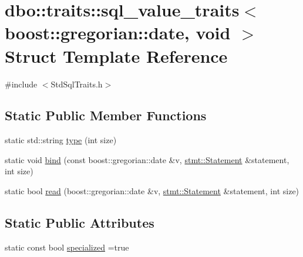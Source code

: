 \hypertarget{structdbo_1_1traits_1_1sql__value__traits_3_01boost_1_1gregorian_1_1date_00_01void_01_4}{\section{dbo\+:\+:traits\+:\+:sql\+\_\+value\+\_\+traits$<$ boost\+:\+:gregorian\+:\+:date, void $>$ Struct Template Reference}
\label{structdbo_1_1traits_1_1sql__value__traits_3_01boost_1_1gregorian_1_1date_00_01void_01_4}
}


{\ttfamily \#include $<$Std\+Sql\+Traits.\+h$>$}

\subsection*{Static Public Member Functions}
\begin{DoxyCompactItemize}
\item 
static std\+::string \hyperlink{structdbo_1_1traits_1_1sql__value__traits_3_01boost_1_1gregorian_1_1date_00_01void_01_4_a12466781c969af01d1a5979963808448}{type} (int size)
\item 
static void \hyperlink{structdbo_1_1traits_1_1sql__value__traits_3_01boost_1_1gregorian_1_1date_00_01void_01_4_a73212ed942ddf155b14de027b5357876}{bind} (const boost\+::gregorian\+::date \&v, \hyperlink{classdbo_1_1stmt_1_1_statement}{stmt\+::\+Statement} \&statement, int size)
\item 
static bool \hyperlink{structdbo_1_1traits_1_1sql__value__traits_3_01boost_1_1gregorian_1_1date_00_01void_01_4_a90e799ef857e15a07ce87a4c3386ce46}{read} (boost\+::gregorian\+::date \&v, \hyperlink{classdbo_1_1stmt_1_1_statement}{stmt\+::\+Statement} \&statement, int size)
\end{DoxyCompactItemize}
\subsection*{Static Public Attributes}
\begin{DoxyCompactItemize}
\item 
static const bool \hyperlink{structdbo_1_1traits_1_1sql__value__traits_3_01boost_1_1gregorian_1_1date_00_01void_01_4_a74c6fab38f896d9610eff0588baaa06e}{specialized} =true
\end{DoxyCompactItemize}


